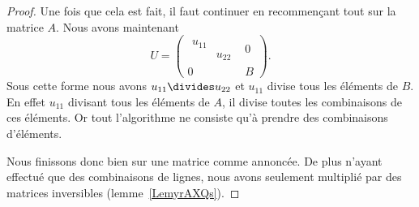 \begin{proof}
	Une fois que cela est fait, il faut continuer en recommençant tout sur la matrice \( A\). Nous avons maintenant
	\begin{equation}
		U=\begin{pmatrix}
			\begin{matrix}
				u_{11} &        \\
				       & u_{22}
			\end{matrix} & 0 \\
			0                           & B
		\end{pmatrix}.
	\end{equation}
	Sous cette forme nous avons \( u_{11}\divides u_{22}\) et \( u_{11}\) divise tous les éléments de \( B\). En effet \( u_{11}\) divisant tous les éléments de \( A\), il divise toutes les combinaisons de ces éléments. Or tout l'algorithme ne consiste qu'à prendre des combinaisons d'éléments.

	Nous finissons donc bien sur une matrice comme annoncée. De plus n'ayant effectué que des combinaisons de lignes, nous avons seulement multiplié par des matrices inversibles (lemme~\ref{LemyrAXQs}).
\end{proof}


